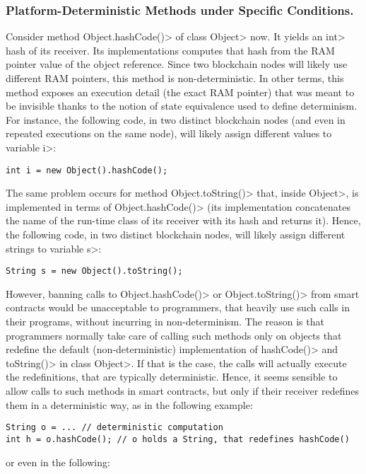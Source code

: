 \subsubsection*{Platform-Deterministic Methods under Specific Conditions.}
Consider method \<Object.hashCode()> of class \<Object> now. It yields an \<int>
hash of its receiver. Its implementations computes that hash from the
RAM pointer value of the object reference.
Since two blockchain nodes will likely use different RAM pointers,
this method is non-deterministic.
In other terms, this method exposes an execution detail (the exact RAM pointer)
that was meant to be invisible thanks to the notion of state equivalence used
to define determinism.
For instance, the following code, in two distinct blockchain nodes
(and even in repeated executions on the same node),
will likely assign different values to variable \<i>:
%
\begin{verbatim}
int i = new Object().hashCode();
\end{verbatim}
%
The same problem occurs for method \<Object.toString()> that, inside
\<Object>, is implemented in terms of \<Object.hashCode()> (its
implementation concatenates
the name of the run-time class of its receiver with its hash and returns it).
Hence, the following code, in two distinct blockchain nodes,
will likely assign different strings to variable \<s>:
%
\begin{verbatim}
String s = new Object().toString();
\end{verbatim}
%
However, banning calls to \<Object.hashCode()> or \<Object.toString()>
from smart contracts would be unacceptable to programmers, that
heavily use such calls in their programs, without incurring in
non-determinism. The reason is that programmers normally
take care of calling such methods only on objects that redefine
the default (non-deterministic) implementation of
\<hashCode()> and \<toString()> in class \<Object>.
If that is the case, the calls will actually
execute the redefinitions, that are typically deterministic. Hence, it seems sensible
to allow calls to such methods in smart contracts, but only if their receiver
redefines them in a deterministic way, as in the following example:

{\small
\begin{verbatim}
String o = ... // deterministic computation
int h = o.hashCode(); // o holds a String, that redefines hashCode()
\end{verbatim}}

\noindent
or even in the following:

